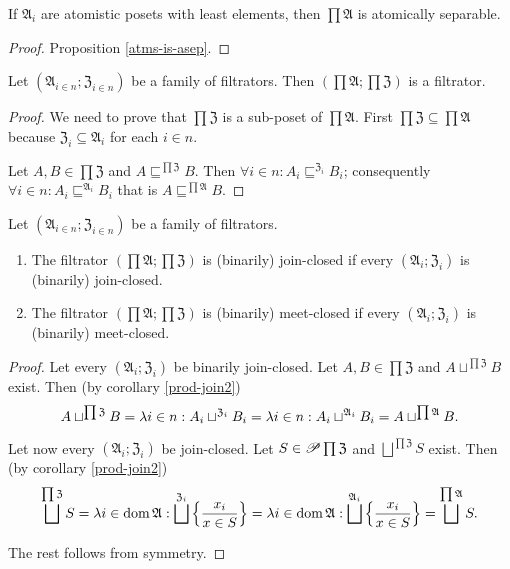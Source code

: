 \begin{cor}
If $\mathfrak{A}_{i}$ are atomistic posets with least elements, then
$\prod\mathfrak{A}$ is atomically separable.\end{cor}
\begin{proof}
Proposition \ref{atms-is-asep}.\end{proof}
\begin{prop}
Let $(\mathfrak{A}_{i\in n};\mathfrak{Z}_{i\in n})$ be a family of
filtrators. Then $\left(\prod\mathfrak{A};\prod\mathfrak{Z}\right)$
is a filtrator.\end{prop}
\begin{proof}
We need to prove that $\prod\mathfrak{Z}$ is a sub-poset of $\prod\mathfrak{A}$.
First $\prod\mathfrak{Z}\subseteq\prod\mathfrak{A}$ because $\mathfrak{Z}_{i}\subseteq\mathfrak{A}_{i}$
for each $i\in n$.

Let $A,B\in\prod\mathfrak{Z}$ and $A\sqsubseteq^{\prod\mathfrak{Z}}B$.
Then $\forall i\in n:A_{i}\sqsubseteq^{\mathfrak{Z}_{i}}B_{i}$; consequently
$\forall i\in n:A_{i}\sqsubseteq^{\mathfrak{A}_{i}}B_{i}$ that is
$A\sqsubseteq^{\prod\mathfrak{A}}B$.\end{proof}
\begin{prop}
Let $(\mathfrak{A}_{i\in n};\mathfrak{Z}_{i\in n})$ be a family of
filtrators.
\begin{enumerate}
\item The filtrator $\left(\prod\mathfrak{A};\prod\mathfrak{Z}\right)$
is (binarily) join-closed if every $(\mathfrak{A}_{i};\mathfrak{Z}_{i})$
is (binarily) join-closed.
\item The filtrator $\left(\prod\mathfrak{A};\prod\mathfrak{Z}\right)$
is (binarily) meet-closed if every $(\mathfrak{A}_{i};\mathfrak{Z}_{i})$
is (binarily) meet-closed.
\end{enumerate}
\end{prop}
\begin{proof}
Let every $(\mathfrak{A}_{i};\mathfrak{Z}_{i})$ be binarily join-closed.
Let $A,B\in\prod\mathfrak{Z}$ and $A\sqcup^{\prod\mathfrak{Z}}B$
exist. Then (by corollary \ref{prod-join2}) 
\[
A\sqcup^{\prod\mathfrak{Z}}B=\lambda i\in n:A_{i}\sqcup^{\mathfrak{Z}_{i}}B_{i}=\lambda i\in n:A_{i}\sqcup^{\mathfrak{A}_{i}}B_{i}=A\sqcup^{\prod\mathfrak{A}}B.
\]


Let now every $(\mathfrak{A}_{i};\mathfrak{Z}_{i})$ be join-closed.
Let $S\in\mathscr{P}\prod\mathfrak{Z}$ and $\bigsqcup^{\prod\mathfrak{Z}}S$
exist. Then (by corollary \ref{prod-join2}) 
\[
\bigsqcup^{\prod\mathfrak{Z}}S=\lambda i\in\operatorname{dom}\mathfrak{A}:\bigsqcup^{\mathfrak{Z}_{i}}\left\{ \frac{x_{i}}{x\in S}\right\}=\lambda i\in\operatorname{dom}\mathfrak{A}:\bigsqcup^{\mathfrak{A}_{i}}\left\{ \frac{x_{i}}{x\in S}\right\}=\bigsqcup^{\prod\mathfrak{A}}S.
\]


The rest follows from symmetry.\end{proof}
